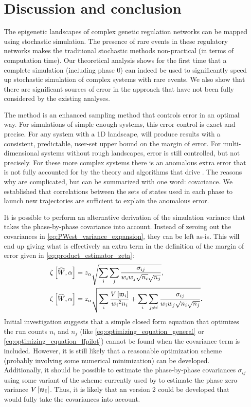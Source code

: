 \chapter{Discussion and conclusion}
\label{chap:conclusion}

The epigenetic landscapes of complex genetic regulation networks can be mapped using stochastic simulation. The presence of rare events in these regulatory networks makes the traditional stochastic methods non-practical (in terms of computation time). Our theoretical analysis shows for the first time that a complete  simulation (including phase $0$) can indeed be used to significantly speed up stochastic simulation of complex systems with rare events. We also show that there are significant sources of error in the  approach that have not been fully considered by the existing analyses.

The  method is an enhanced sampling method that controls error in an optimal way. For simulations of simple enough systems, this error control is exact and precise. For any system with a 1D landscape,  will produce results with a consistent, predictable, user-set upper bound on the margin of error. For multi-dimensional systems without rough landscapes, error is still controlled, but not precisely. For these more complex systems there is an anomalous extra error that is not fully accounted for by the theory and algorithms that drive . The reasons why are complicated, but can be summarized with one word: covariance. We established that correlations between the sets of states used in each phase to launch new trajectories are sufficient to explain the anomalous error.

It is possible to perform an alternative derivation of the simulation variance that takes the phase-by-phase covariance into account. Instead of zeroing out the covariances in \eqref{eq:PWest_variance_expansion}, they can be left as-is. This will end up giving what is effectively an extra term in the definition of the margin of error given in \eqref{eq:product_estimator_zeta}:
\begin{align*}
    \zeta \left[ \widehat{W}, \alpha \right] &= z_{\alpha} \sqrt{\sum_i \sum_j \frac{\sigma_{ij}}{w_{i} w_{j} \sqrt{n_i} \sqrt{n_j}}}, \\
    \zeta \left[ \widehat{W}, \alpha \right] &= z_{\alpha} \sqrt{\sum_i \frac{V \left[ \mathfrak{w}_{i} \right]}{w_{i} {}^2 n_i} + \sum_i \sum_{j \neq i} \frac{\sigma_{ij}}{w_{i} w_{j} \sqrt{n_i} \sqrt{n_j}}}.
\end{align*}
Initial investigation suggests that a simple closed form equation that optimizes the run counts $n_i$ and $n_j$ (like \eqref{eq:optimizing_equation_general} or \eqref{eq:optimizing_equation_ffpilot}) cannot be found when the covariance term is included. However, it is still likely that a reasonable optimization scheme (probably involving some numerical minimization) can be developed. Additionally, it should be possible to estimate the phase-by-phase covariances $\sigma_{ij}$ using some variant of the scheme currently used by  to estimate the phase zero variance $V \left[ \mathfrak{w}_{0} \right]$. Thus, it is likely that an  version 2 could be developed that would fully take the covariances into account.


